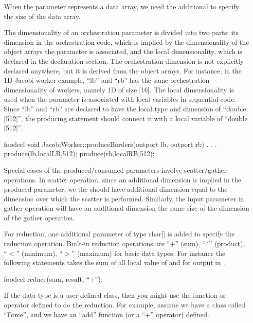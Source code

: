 When the parameter represents a data array, we need the additional
 to specify the size of the data array. 

The dimensionality of an orchestration parameter is divided into two parts: 
its dimension in the orchestration code, which is implied by the dimensionality
of the object arrays the parameter is associated, and the local dimensionality,
which is declared in the declaration section. The orchestration dimension is not
explicitly declared anywhere, but it is derived from the object arrays. For 
instance, in the 1D Jacobi worker example, ``lb'' and ``rb'' has the same 
orchestration dimensionality of workers, namely 1D of size [16]. The local
dimensionality is used when the parameter is associated with local variables 
in sequential code. Since ``lb'' and ``rb'' are declared to have the local
type and dimension of ``double [512]'', the producing statement should connect
it with a local variable of ``double [512]''.

\begin{SaveVerbatim}{foodecl}
    void JacobiWorker::produceBorders(outport lb, outport rb){
      . . .
      produce(lb,localLB,512);
      produce(rb,localRB,512);
    }
\end{SaveVerbatim}

Special cases of the produced/consumed parameters involve scatter/gather
operations. In scatter operation, since an additional dimension is implied in
the produced parameter, we the  should have additional
dimension equal to the dimension over which the scatter is performed. Similarly,
the input parameter in gather operation will have an additional dimension the
same size of the dimension of the gather operation.

For reduction, one additional parameter of type char[] is added to specify the
reduction operation. Built-in reduction operations are ``+'' (sum), ``*'' (product),
``$<$'' (minimum), ``$>$'' (maximum) for basic data types. For instance the 
following statements takes the sum of all local value of  and 
for output in .

\begin{SaveVerbatim}{foodecl}
    reduce(sum, result, ``+'');
\end{SaveVerbatim}

If the data type is a user-defined class, then you might use the function or
operator defined to do the reduction. For example, assume we have a class
called ``Force'', and we have an ``add'' function (or a ``+'' operator) defined.

